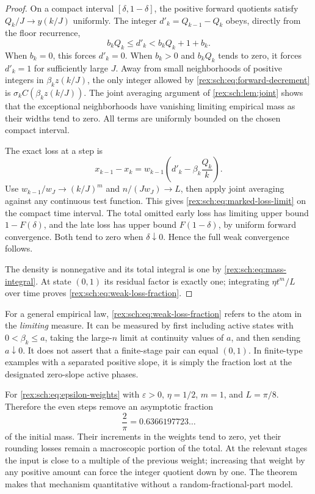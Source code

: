 \begin{proof}
On a compact interval $[\delta,1-\delta]$, the positive forward
quotients satisfy $Q_k/J\to y(k/J)$ uniformly. The integer
$d'_k=Q_{k-1}-Q_k$ obeys, directly from the floor recurrence,
\begin{equation}\label{rex:sch:eq:forward-decrement}
 b_kQ_k\leq d'_k<b_kQ_k+1+b_k.
\end{equation}
When $b_k=0$, this forces $d'_k=0$. When $b_k>0$ and $b_kQ_k$
tends to zero, it forces $d'_k=1$ for sufficiently large $J$.
Away from small neighborhoods of positive integers in
$\beta_k z(k/J)$, the only integer allowed by
\eqref{rex:sch:eq:forward-decrement} is
$\sigma_k C(\beta_k z(k/J))$. The joint averaging argument of
\cref{rex:sch:lem:joint} shows that the exceptional neighborhoods have
vanishing limiting empirical mass as their widths tend to zero.
All terms are uniformly bounded on the chosen compact interval.

The exact loss at a step is
\[
 x_{k-1}-x_k=w_{k-1}
 \left(d'_k-\beta_k\frac{Q_k}{k}\right).
\]
Use $w_{k-1}/w_J\to(k/J)^m$ and $n/(Jw_J)\to L$, then apply
joint averaging against any continuous test function. This gives
\eqref{rex:sch:eq:marked-loss-limit} on the compact time interval.
The total omitted early loss has limiting upper bound
$1-F(\delta)$, and the late loss has upper bound $F(1-\delta)$,
by uniform forward convergence. Both tend to zero when
$\delta\downarrow0$. Hence the full weak convergence follows.

The density is nonnegative and its total integral is one by
\eqref{rex:sch:eq:mass-integral}. At state $(0,1)$ its residual factor is
exactly one; integrating $\eta t^m/L$ over time proves
\eqref{rex:sch:eq:weak-loss-fraction}.
\end{proof}

For a general empirical law, \eqref{rex:sch:eq:weak-loss-fraction} refers
to the atom in the \emph{limiting} measure. It can be measured by
first including active states with $0<\beta_k\leq a$, taking the
large-$n$ limit at continuity values of $a$, and then sending
$a\downarrow0$. It does not assert that a finite-stage pair can
equal $(0,1)$. In finite-type examples with a separated positive
slope, it is simply the fraction lost at the designated
zero-slope active phases.

For \eqref{rex:sch:eq:epsilon-weights} with $\varepsilon>0$,
$\eta=1/2$, $m=1$, and $L=\pi/8$. Therefore the even steps remove
an asymptotic fraction
\begin{equation}\label{rex:sch:eq:two-over-pi-loss}
 \frac{2}{\pi}=0.6366197723\ldots
\end{equation}
of the initial mass. Their increments in the weights tend to zero,
yet their rounding losses remain a macroscopic portion of the total.
At the relevant stages the input is close to a multiple of the
previous weight; increasing that weight by any positive amount
can force the integer quotient down by one. The theorem makes
that mechanism quantitative without a random-fractional-part model.

